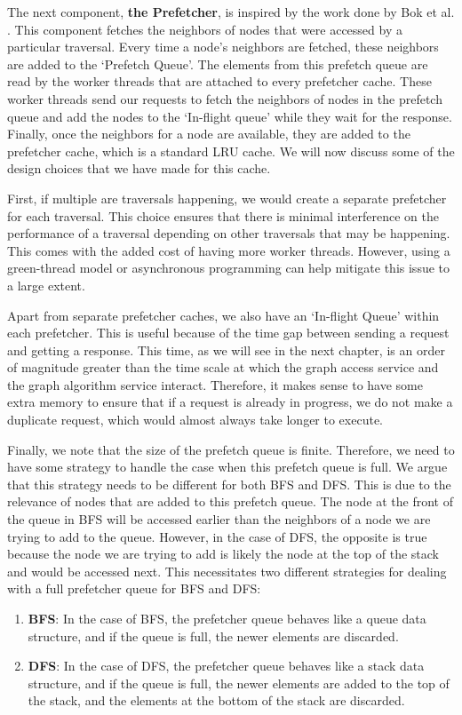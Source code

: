 \medskip
The next component, \textbf{the Prefetcher}, is inspired by the work done
by Bok et al. \cite{bok2020memory}. This component fetches the neighbors of
nodes that were accessed by a particular traversal. Every time a node's
neighbors are fetched, these neighbors are added to the `Prefetch Queue'. The
elements from this prefetch queue are read by the worker threads that are
attached to every prefetcher cache. These worker threads send our requests to
fetch the neighbors of nodes in the prefetch queue and add the nodes to the
`In-flight queue' while they wait for the response. Finally, once the neighbors
for a node are available, they are added to the prefetcher cache, which is a
standard LRU cache. We will now discuss some of the design choices that we have
made for this cache.

\medskip
First, if multiple are traversals happening, we would create a separate
prefetcher for each traversal. This choice ensures that there is minimal
interference on the performance of a traversal depending on other traversals
that may be happening. This comes with the added cost of having more worker
threads. However, using a green-thread model or asynchronous programming can help
mitigate this issue to a large extent. 

\medskip
Apart from separate prefetcher caches, we also have an `In-flight Queue' within
each prefetcher. This is useful because of the time gap between sending a
request and getting a response. This time, as we will see in the next chapter,
is an order of magnitude greater than the time scale at which the graph access
service and the graph algorithm service interact. Therefore, it makes sense to have
some extra memory to ensure that if a request is already in
progress, we do not make a duplicate request, which would almost always take
longer to execute. 

\medskip
Finally, we note that the size of the prefetch queue is finite. Therefore, we
need to have some strategy to handle the case when this prefetch queue is full.
We argue that this strategy needs to be different for both BFS and DFS. This is
due to the relevance of nodes that are added to this prefetch queue. The node at
the front of the queue in BFS will be accessed earlier than the neighbors of a
node we are trying to add to the queue. However, in the case of DFS, the
opposite is true because the node we are trying to add is likely the node
at the top of the stack and would be accessed next. This necessitates two
different strategies for dealing with a full prefetcher queue for BFS and DFS:
\begin{enumerate}
    \item \textbf{BFS}: In the case of BFS, the prefetcher queue behaves like a
        queue data structure, and if the queue is full, the newer elements are
        discarded.
    \item \textbf{DFS}: In the case of DFS, the prefetcher queue behaves like a
        stack data structure, and if the queue is full, the newer elements
        are added to the top of the stack, and the elements at the bottom of the
        stack are discarded.
\end{enumerate}

